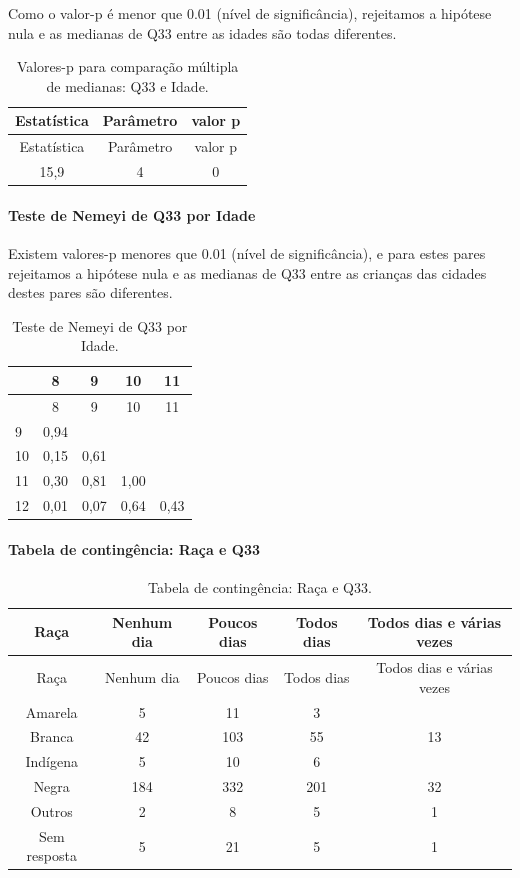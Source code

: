 \documentclass[]{article}
\let\oldparagraph\paragraph
\renewcommand{\paragraph}[1]{\oldparagraph{#1}\mbox{}}
\begin{document}
Como o valor-p é menor que 0.01 (nível de significância), rejeitamos a hipótese nula e as medianas de Q33 entre as idades são todas diferentes.

\begin{longtable}[]{@{}ccc@{}}
\caption{\label{tab:unnamed-chunk-1160}Valores-p para comparação múltipla de medianas: Q33 e Idade.}\tabularnewline
\toprule
Estatística & Parâmetro & valor p\tabularnewline
\midrule
\endfirsthead
\toprule
Estatística & Parâmetro & valor p\tabularnewline
\midrule
\endhead
15,9 & 4 & 0\tabularnewline
\bottomrule
\end{longtable}

\hypertarget{teste-de-nemeyi-de-q33-por-idade}{%
\paragraph{Teste de Nemeyi de Q33 por Idade}\label{teste-de-nemeyi-de-q33-por-idade}}

Existem valores-p menores que 0.01 (nível de significância), e para estes pares rejeitamos a hipótese nula e as medianas de Q33 entre as crianças das cidades destes pares são diferentes.

\begin{longtable}[]{@{}lcccc@{}}
\caption{\label{tab:unnamed-chunk-1162}Teste de Nemeyi de Q33 por Idade.}\tabularnewline
\toprule
& 8 & 9 & 10 & 11\tabularnewline
\midrule
\endfirsthead
\toprule
& 8 & 9 & 10 & 11\tabularnewline
\midrule
\endhead
9 & 0,94 & & &\tabularnewline
10 & 0,15 & 0,61 & &\tabularnewline
11 & 0,30 & 0,81 & 1,00 &\tabularnewline
12 & 0,01 & 0,07 & 0,64 & 0,43\tabularnewline
\bottomrule
\end{longtable}

\cleardoublepage

\hypertarget{tabela-de-continguxeancia-rauxe7a-e-q33}{%
\paragraph{Tabela de contingência: Raça e Q33}\label{tabela-de-continguxeancia-rauxe7a-e-q33}}

\begin{longtable}[]{@{}ccccc@{}}
\caption{\label{tab:unnamed-chunk-1163}Tabela de contingência: Raça e Q33.}\tabularnewline
\toprule
Raça & Nenhum dia & Poucos dias & Todos dias & Todos dias e várias vezes\tabularnewline
\midrule
\endfirsthead
\toprule
Raça & Nenhum dia & Poucos dias & Todos dias & Todos dias e várias vezes\tabularnewline
\midrule
\endhead
Amarela & 5 & 11 & 3 &\tabularnewline
Branca & 42 & 103 & 55 & 13\tabularnewline
Indígena & 5 & 10 & 6 &\tabularnewline
Negra & 184 & 332 & 201 & 32\tabularnewline
Outros & 2 & 8 & 5 & 1\tabularnewline
Sem resposta & 5 & 21 & 5 & 1\tabularnewline
\bottomrule
\end{longtable}
\end{document}
